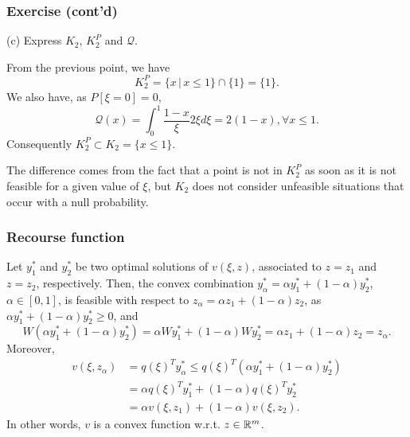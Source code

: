 \documentclass{beamer}
\newtheorem{theo}{Theorem}
\def\bxi{\boldsymbol\xi}
\def\bxi{\boldsymbol\xi}
\begin{document}
\begin{frame}
\frametitle{Exercise (cont'd)}
	
{\blue (c)} Express $K_2$, $K_2^P$ and $\mathcal{Q}$.
	
\mbox{}
	
From the previous point, we have
\[
K_2^P = \lbrace x \,|\, x \leq 1 \rbrace \cap \lbrace 1 \rbrace =
\lbrace 1 \rbrace.
\]
We also have, as $P[\xi = 0] = 0$,
\[
\mathcal{Q}(x) = \int_0^1 \frac{1-x}{\xi} 2\xi d\xi = 2(1-x), \forall
x \leq 1.
\]
Consequently $K_2^P \subset K_2 = \lbrace x \leq 1 \rbrace$.

\mbox{}

The difference comes from the fact that a point is not in $K_2^P$ as soon as it is not feasible for a given value of $\xi$, but $K_2$ does not consider unfeasible situations that occur with a null probability.
	
	
	
\end{frame}

\begin{frame}
\frametitle{Recourse function}

Let $y^*_1$ and $y^*_2$ be two optimal solutions of $v(\xi, z)$, associated to $z = z_1$ and $z = z_2$, respectively.
Then, the convex combination $y^*_{\alpha} = \alpha y_1^*+(1-\alpha)y_2^*$, $\alpha \in [0,1]$, is feasible with respect to $z_{\alpha} = \alpha z_1 + (1-\alpha) z_2$, as $\alpha y_1^*+(1-\alpha)y_2^* \geq 0$, and
$$
W(\alpha y_1^*+(1-\alpha)y_2^*)
= \alpha W y_1^* + (1-\alpha) W y_2^*
= \alpha z_1 + (1-\alpha) z_2 = z_{\alpha}.
$$
Moreover,
\begin{align*}
v(\xi, z_{\alpha}) & = q(\xi)^Ty_{\alpha}^* \leq
q(\xi)^T(\alpha y_1^*+(1-\alpha)y_2^*) \\
& = \alpha q(\xi)^T y_1^*+(1-\alpha)q(\xi)^Ty_2^* \\
& = \alpha v(\xi, z_1) + (1-\alpha) v(\xi, z_2).
\end{align*}
In other words, $v$ is a convex function w.r.t. $z \in \mathbb{R}^m$.


\end{frame}
\end{document}

